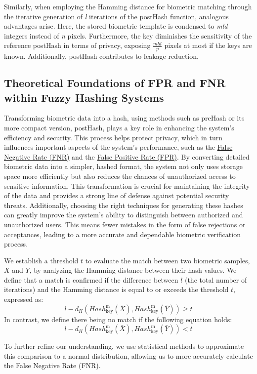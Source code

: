 Similarly, when employing the Hamming distance for biometric matching through the iterative generation of \textit{l} iterations of the postHash function, analogous advantages arise. Here, the stored biometric template is condensed to \textit{mld} integers instead of \textit{n} pixels. Furthermore, the key diminishes the sensitivity of the reference postHash in terms of privacy, exposing \(\frac{mld}{p}\) pixels at most if the keys are known. Additionally, postHash contributes to leakage reduction.

\subsection{Theoretical Foundations of FPR and FNR within Fuzzy Hashing Systems}

Transforming biometric data into a hash, using methods such as preHash or its more compact version, postHash, plays a key role in enhancing the system's efficiency and security. This process helps protect privacy, which in turn influences important aspects of the system's performance, such as the \hyperref[def:FNR]{False Negative Rate (FNR)} and the \hyperref[def:FPR]{False Positive Rate (FPR)}. By converting detailed biometric data into a simpler, hashed format, the system not only uses storage space more efficiently but also reduces the chances of unauthorized access to sensitive information. This transformation is crucial for maintaining the integrity of the data and provides a strong line of defense against potential security threats. Additionally, choosing the right techniques for generating these hashes can greatly improve the system's ability to distinguish between authorized and unauthorized users. This means fewer mistakes in the form of false rejections or acceptances, leading to a more accurate and dependable biometric verification process.

We establish a threshold \(t\) to evaluate the match between two biometric samples, \(\bar{X}\) and \(\bar{Y}\), by analyzing the Hamming distance between their hash values.
We define that a match is confirmed if the difference between \(l\) (the total number of iterations) and the Hamming distance is equal to or exceeds the threshold \(t\), expressed as: \[l - d_H(Hash_{\text{key}}^\text{m}(\bar{X}), Hash_{\text{key}}^\text{m}(\bar{Y})) \geq t\]
In contrast, we define there being no match if the following equation holds: \[l - d_H(Hash_{\text{key}}^\text{m}(\bar{X}), Hash_{\text{key}}^\text{m}(\bar{Y})) < t\]

To further refine our understanding, we use statistical methods to approximate this comparison to a normal distribution, allowing us to more accurately calculate the False Negative Rate (FNR). 

